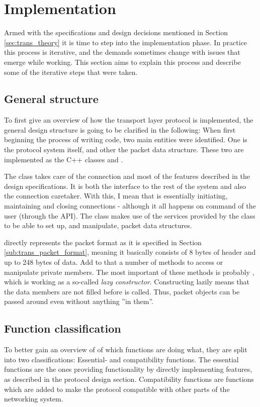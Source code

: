 \section{Implementation}\label{sec:trans_implementation}
Armed with the specifications and design decisions mentioned in Section \ref{sec:trans_theory} it is time to step into the implementation phase. In practice this process is iterative, and the demands sometimes change with issues that emerge while working. This section aims to explain this process and describe some of the iterative steps that were taken.


\subsection{General structure}
To first give an overview of how the transport layer protocol is implemented, the general design structure is going to be clarified in the following: When first beginning the process of writing code, two main entities were identified. One is the protocol system itself, and other the packet data structure. These two are implemented as the C++ classes  and .

The  class takes care of the connection and most of the features described in the design specifications. It is both the interface to the rest of the system and also the connection caretaker. With this, I mean that  is essentially initiating, maintaining and closing connections - although it all happens on command of the user (through the API). The  class makes use of the services provided by the  class to be able to set up, and manipulate, packet data structures.

 directly represents the packet format as it is specified in Section \ref{sub:trans_packet_format}, meaning it basically consists of 8 bytes of header and up to 248 bytes of data. Add to that a number of methods to access or manipulate private members. The most important of these methods is probably , which is working as a so-called \textit{lazy constructor}. Constructing lazily means that the  data members are not filled before  is called. Thus, packet objects can be passed around even without anything ''in them''.


\subsection{Function classification}
To better gain an overview of of which functions are doing what, they are split into two classifications: Essential- and compatibility functions. The essential functions are the ones providing functionality by directly implementing features, as described in the protocol design section. Compatibility functions are functions which are added to make the protocol compatible with other parts of the networking system.


